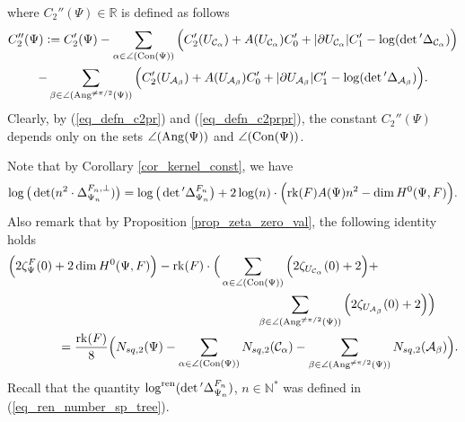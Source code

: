 \documentclass[12pt]{article}
\numberwithin{equation}{section}
\theoremstyle{theorem}
\theoremstyle{definition}
\theoremstyle{remark}
\newcommand{\real}{\mathbb{R}}
\newcommand{\nat}{\mathbb{N}}
\newcommand{\laplcomp}{\Delta}
\newcommand{\rk}[1]{{\rm{rk}} ( #1 )}
\begin{document}
	where $C_2''(\Psi) \in \real$ is defined as follows
	\begin{multline}\label{eq_defn_c2prpr}
		C_2''(\Psi) 
		:= 
		C_2'(\Psi)
		-
		\sum_{\alpha \in \angle({\rm{Con}}(\Psi))}
		\Big( 
			C_2'(U_{\mathcal{C}_{\alpha}})		
			+
			A(U_{\mathcal{C}_{\alpha}})C_0'
			+
			|\partial U_{\mathcal{C}_{\alpha}}| C_1'
			-
			\log ( \det{}' \laplcomp_{\mathcal{C}_{\alpha}})
		\Big)
		\\
		-
		\sum_{\beta \in \angle({\rm{Ang}}^{\neq \pi/2}(\Psi))}
		\Big(
			C_2'(U_{\mathcal{A}_{\beta}})
			+
			A(U_{\mathcal{A}_{\beta}})C_0'
			+
			|\partial U_{\mathcal{A}_{\beta}}| C_1'
			-
			\log ( \det{}' \laplcomp_{\mathcal{A}_{\beta}})
		\Big).
	\end{multline}
	Clearly, by (\ref{eq_defn_c2pr}) and (\ref{eq_defn_c2prpr}), the constant $C_2''(\Psi)$ depends only on the sets $\angle({\rm{Ang}}(\Psi))$ and $\angle({\rm{Con}}(\Psi))$.
	\par
	Note that by Corollary \ref{cor_kernel_const}, we have
	\begin{equation}\label{eq_log_det_log_n1}
		\log \big(\det(n^2 \cdot\laplcomp_{\Psi_n}^{F_n, \perp})\big)
		=
		\log \big(\det{}'\laplcomp_{\Psi_n}^{F_n} \big)
		+
		2 \log(n) \cdot \Big(
			\rk{F} A(\Psi)n^2 - \dim H^0(\Psi, F)
		\Big).
	\end{equation}
	Also remark that by Proposition \ref{prop_zeta_zero_val}, the following identity holds
	\begin{equation}\label{eq_fin_aux_10000}
	\begin{aligned}
		&
		\Big( 2 \zeta_{\Psi}^{F}(0) + 2 \dim H^0(\Psi, F) \Big)
		-
		\rk{F} \cdot
		\Big(
		\sum_{\alpha \in \angle({\rm{Con}}(\Psi))}
		\Big( 2 \zeta_{U_{\mathcal{C}_{\alpha}}}(0) + 2 \Big)
		+
		\\
		&
		\qquad \qquad \qquad \qquad \qquad \qquad  \qquad \qquad  \qquad \qquad
		\sum_{\beta \in \angle({\rm{Ang}}^{\neq \pi/2}(\Psi))}
		\Big( 2 \zeta_{U_{\mathcal{A}_{\beta}}}(0) + 2 \Big)
		\Big)
		\\
		&
		\qquad \qquad
		=
		\frac{\rk{F}}{8} 
		\Big( N_{sq, 2}(\Psi) -
			\sum_{\alpha \in \angle({\rm{Con}}(\Psi))}
			N_{sq, 2}(\mathcal{C}_{\alpha})
			-
			\sum_{\beta \in \angle({\rm{Ang}}^{\neq \pi/2}(\Psi))}
			N_{sq, 2}(\mathcal{A}_{\beta})
		\Big).
	\end{aligned}
	\end{equation}
	Recall that the quantity $\log^{{\rm{ren}}} (\det{}'\laplcomp_{\Psi_n}^{F_n} )$, $n \in \nat^*$ was defined in (\ref{eq_ren_number_sp_tree}). 
\end{document}
